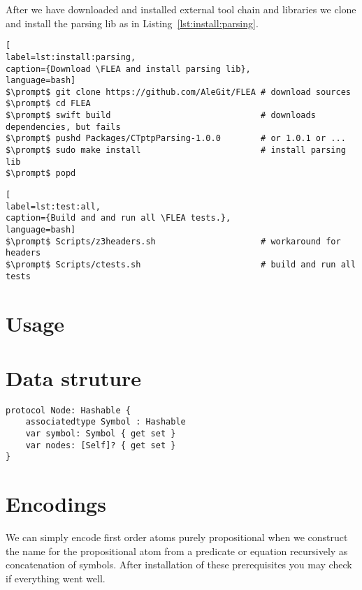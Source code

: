 After we have downloaded and installed external tool chain and libraries we clone \FLEA{} and install the parsing lib as in Listing~\ref{lst:install:parsing}.

\begin{lstlisting}[
label=lst:install:parsing,
caption={Download \FLEA and install parsing lib},
language=bash]
$\prompt$ git clone https://github.com/AleGit/FLEA # download sources
$\prompt$ cd FLEA
$\prompt$ swift build                              # downloads dependencies, but fails
$\prompt$ pushd Packages/CTptpParsing-1.0.0        # or 1.0.1 or ...
$\prompt$ sudo make install                        # install parsing lib
$\prompt$ popd
\end{lstlisting}

\begin{lstlisting}[
label=lst:test:all,
caption={Build and and run all \FLEA tests.},
language=bash]
$\prompt$ Scripts/z3headers.sh                     # workaround for headers
$\prompt$ Scripts/ctests.sh                        # build and run all tests
\end{lstlisting}



\section{Usage}

\section{Data struture}

\begin{lstlisting}[language=flea, caption={Simplified definition of general terms}]
protocol Node: Hashable {
	associatedtype Symbol : Hashable
	var symbol: Symbol { get set }
	var nodes: [Self]? { get set }
}
\end{lstlisting}

\section{Encodings}


We can simply encode first order atoms purely propositional
when we construct the name for the propositional atom
from a predicate or equation recursively as concatenation of symbols.
After installation of these prerequisites you may check if everything went well.



